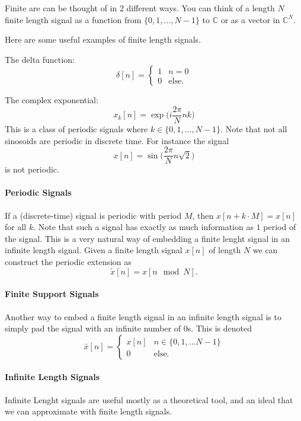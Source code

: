 \documentclass{article}[11pt]
\newcommand{\defeq}{\vcentcolon=}
\begin{document}
Finite  are can be thought of in 2 different ways. 
You can think of a length $N$ finite length signal as a function from $\{0,1,\ldots, N-1\}$ to $\mathbb{C}$ or as a vector in $\mathbb{C}^N$.

Here are some useful examples of finite length signals.

The delta function:
$$
\delta[n] = 
\begin{cases}
	1 & n=0 \\
	0 & \text{else.}
\end{cases}
$$

The complex exponential:
$$x_k[n] = \exp\Big(i\frac{2\pi}{N}nk\Big)$$
This is a class of periodic signals where $k\in\{0,1,\ldots, N-1\}$. 
Note that not all sinosoids are periodic in discrete time. 
For instance the signal $$x[n] = \sin\Big(\frac{2\pi}{N}n\sqrt{2}\Big)$$ is not periodic.

\paragraph{Periodic Signals}
If a (discrete-time) signal is periodic with period $M$, then $x[n + k\cdot M] = x[n]$ for all $k$. Note that such a signal has exactly as much information as $1$ period of the signal. 
This is a very natural way of embedding a finite lenght signal in an infinite length signal.
Given a finite length signal $x[n]$ of length $N$ we can construct the periodic extension as 
$$\tilde{x}[n] = x[n\mod N].$$


\paragraph{Finite Support Signals}
Another way to embed a finite length signal in an infinite length signal is to simply pad the signal with an infinite number of $0$s.
This is denoted
$$
\bar{x}[n] = 
\begin{cases}
	x[n] & n \in \{0,1,\ldots N-1\}\\
	0 & \text{else.}
\end{cases}
$$

\paragraph{Infinite Length Signals}
Infinite Lenght signals are useful mostly as a theoretical tool, and an ideal that we can approximate with finite length signals.
\end{document}
